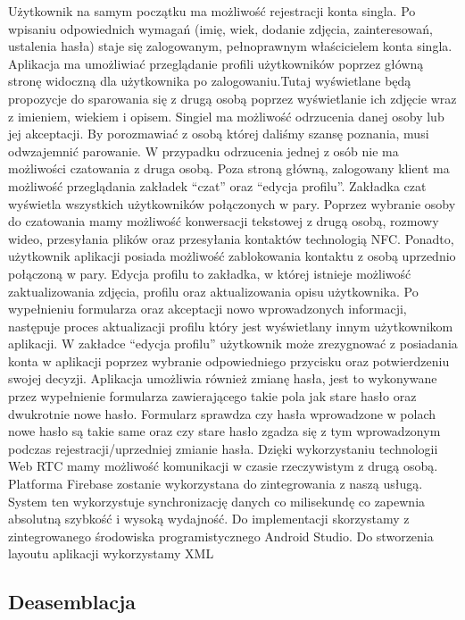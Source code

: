 \documentclass[12pt,a4paper]{article}
\begin{document}
\hspace{10mm}Użytkownik na samym początku ma możliwość rejestracji konta singla. Po wpisaniu odpowiednich wymagań (imię, wiek, dodanie zdjęcia, zainteresowań, ustalenia hasła) staje się zalogowanym, pełnoprawnym właścicielem konta singla.
Aplikacja ma umożliwiać przeglądanie profili użytkowników poprzez główną stronę widoczną dla użytkownika po zalogowaniu.Tutaj wyświetlane będą propozycje do sparowania się z drugą osobą poprzez wyświetlanie ich zdjęcie wraz z imieniem, wiekiem i opisem. Singiel ma możliwość odrzucenia danej osoby lub jej akceptacji. By porozmawiać z osobą której daliśmy szansę poznania, musi odwzajemnić parowanie. W przypadku odrzucenia jednej z osób nie ma możliwości czatowania z druga osobą. 
Poza stroną główną, zalogowany klient ma możliwość przeglądania zakładek “czat” oraz “edycja profilu”. Zakładka czat wyświetla wszystkich użytkowników połączonych w pary. Poprzez wybranie osoby do czatowania mamy możliwość konwersacji tekstowej z drugą osobą, rozmowy wideo, przesyłania plików oraz przesyłania kontaktów technologią NFC. Ponadto, użytkownik aplikacji posiada możliwość zablokowania kontaktu z osobą uprzednio połączoną w pary. Edycja profilu to zakładka, w której istnieje możliwość zaktualizowania zdjęcia, profilu oraz aktualizowania opisu użytkownika. Po wypełnieniu formularza oraz akceptacji nowo wprowadzonych informacji, następuje proces aktualizacji profilu który jest wyświetlany innym użytkownikom aplikacji. W zakładce “edycja profilu” użytkownik może zrezygnować z posiadania konta w aplikacji poprzez wybranie odpowiedniego przycisku oraz potwierdzeniu swojej decyzji. Aplikacja umożliwia również zmianę hasła, jest to wykonywane przez wypełnienie formularza zawierającego takie pola jak stare hasło oraz dwukrotnie nowe hasło. Formularz sprawdza czy hasła wprowadzone w polach nowe hasło są takie same oraz czy stare hasło zgadza się z tym wprowadzonym podczas rejestracji/uprzedniej zmianie hasła. Dzięki wykorzystaniu technologii Web RTC\cite{webrtcWikipedia} mamy możliwość komunikacji w czasie rzeczywistym z drugą osobą. Platforma Firebase\cite{firebase} zostanie wykorzystana do zintegrowania z naszą usługą. System ten wykorzystuje synchronizację danych co milisekundę co zapewnia absolutną szybkość i wysoką wydajność.
Do implementacji skorzystamy z zintegrowanego środowiska programistycznego Android Studio. Do stworzenia layoutu aplikacji wykorzystamy XML\cite{xml}


\subsection{Deasemblacja}
\end{document}
